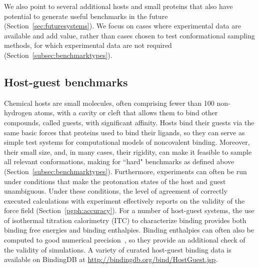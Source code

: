 \documentclass[aps,pre,twocolumn,nofootinbib,superscriptaddress,10pt, final,tightenlines]{revtex4-1}
\begin{document}
We also point to several additional hosts and small proteins that also have potential to generate useful benchmarks in the future (Section~\ref{sec:futuresystems}). 
We focus on cases where experimental data are available and add value, rather than cases chosen to test conformational sampling methods, for which experimental data are not required (Section~\ref{subsec:benchmarktypes}). 

\subsection{Host-guest benchmarks}
\label{sec:hgbenchmarks}
Chemical hosts are small molecules, often comprising fewer than 100 non-hydrogen atoms, with a cavity or cleft that allows them to bind other compounds, called guests, with significant affinity.  
Hosts bind their guests via the same basic forces that proteins used to bind their ligands, so they can serve as simple test systems for computational models of noncovalent binding. 
Moreover, their small size, and, in many cases, their rigidity, can make it feasible to sample all relevant conformations, making for ``hard" benchmarks as defined above (Section~\ref{subsec:benchmarktypes}).  
Furthermore, experiments can often be run under conditions that make the protonation states of the host and guest unambiguous. 
Under these conditions, the level of agreement of correctly executed calculations with experiment effectively reports on the validity of the force field (Section~\ref{pgph:accuracy}). 
For a number of host-guest systems, the use of isothermal titration calorimetry (ITC) to characterize binding provides both binding free energies and binding enthalpies. 
Binding enthalpies can often also be computed to good numerical precision~\cite{henriksen_computational_2015}, so they provide an additional check of the validity of simulations.
A variety of curated host-guest binding data is available on BindingDB at \url{http://bindingdb.org/bind/HostGuest.jsp}.
\end{document}
